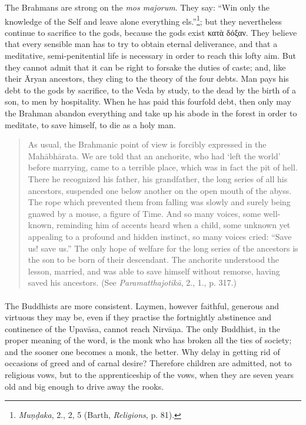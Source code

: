 \documentclass[a4paper, 11pt, oneside, english]{article}
\begin{document}
The Brahmans are strong on the \emph{mos majorum}. They say: ``Win only the knowledge of the Self and leave alone everything els.''\footnote{\emph{Muṇḍaka}, 2., 2, 5 (Barth, \emph{Religions}, p. 81).}; but they nevertheless continue to sacrifice to the gods, because the gods exist κατὰ δόξαν. They believe that every sensible man has to try to obtain eternal deliverance, and that a meditative, semi-penitential life is necessary in order to reach this lofty aim. But they cannot admit that it can be right to forsake the duties of caste; and, like their Āryan ancestors, they cling to the theory of the four debts. Man pays his debt to the gods by sacrifice, to the Veda by study, to the dead by the birth of a son, to men by hospitality. When he has paid this fourfold debt, then only may the Brahman abandon everything and take up his abode in the forest in order to meditate, to save himself, to die as a holy man.
\begin{quotation}
\small
As usual, the Brahmanic point of view is forcibly expressed in the Mahābhārata. We are told that an anchorite, who had `left the world' before marrying, came to a terrible place, which was in fact the pit of hell. There he recognized his father, his grandfather, the long series of all his ancestors, suspended one below another on the open mouth of the abyss. The rope which prevented them from falling was slowly and surely being gnawed by a mouse, a figure of Time. And so many voices, some well-known, reminding him of accents heard when a child, some unknown yet appealing to a profound and hidden instinct, so many voices cried: ``Save us! save us.'' The only hope of welfare for the long series of the ancestors is the son to be born of their descendant. The anchorite understood the lesson, married, and was able to save himself without remorse, having saved his ancestors. (See \emph{Paramatthajotikā}, 2., 1., p. 317.)
\end{quotation}
\paragraph{}
The Buddhists are more consistent. Laymen, however faithful, generous and virtuous they may be, even if they practise the fortnightly abstinence and continence of the Upavāsa, cannot reach Nirvāṇa. The only Buddhist, in the proper meaning of the word, is the monk who has broken all the ties of society; and the sooner one becomes a monk, the better. Why delay in getting rid of occasions of greed and of carnal desire? Therefore children are admitted, not to religious vows, but to the apprenticeship of the vows, when they are seven years old and big enough to drive away the rooks.
\end{document}
